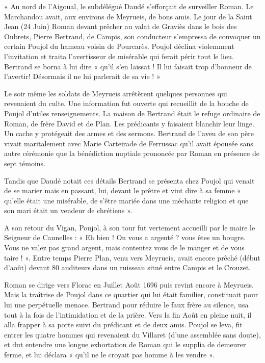 \begin{tcolorbox}[
  colback=white,
  colframe=black,
  boxrule=0.7pt,
  arc=0pt,
  left=0.20cm,
  right=0.20cm,
  top=0.10cm,
  bottom=0.10cm,
  boxsep=0pt
]
\small

« Au nord de l’Aigoual, le subdélégué Daudé s’efforçait de surveiller Roman. Le Marchandou avait, aux environs de Meyrueis, de bons amis. Le jour de la Saint Jean (24 Juin) Roman devant prêcher au valat de Graviès dans le bois des Oubrets, Pierre Bertrand, de Campis, son conducteur s’empressa de convoquer un certain Poujol du hameau voisin de Pourcarès. Poujol déclina violemment l’invitation et traita l’avertisseur de misérable qui ferait périr tout le lieu. Bertrand se borna à lui dire « qu’il s’en laissat ! Il lui faisait trop d’honneur de l’avertir! Désormais il ne lui parlerait de sa vie ! »

Le soir même les soldats de Meyrueis arrêtèrent quelques personnes qui revenaient du culte. Une information fut ouverte qui recueillit de la bouche de Poujol d’utiles renseignements. La maison de Bertrand était le refuge ordinaire de Roman, de frère David et de Plan. Les prédicants y faisaient blanchir leur linge. Un cache y protégeait des armes et des sermons. Bertrand de l’aveu de son père vivait maritalement avec Marie Carteirade de Ferrussac qu’il avait épousée sans autre cérémonie que la bénédiction nuptiale prononcée par Roman en présence de sept témoins.

Tandis que Daudé notait ces détails Bertrand se présenta chez Poujol qui venait de se marier mais en passant, lui, devant le prêtre et vint dire à sa femme « qu’elle était une misérable, de s’être mariée dans une méchante religion et que son mari était un vendeur de chrétiens ».

A son retour du Vigan, Poujol, à son tour fut vertement accueilli par le maire le Seigneur de Caunelles : « Eh bien ! On vous a argenté ? vous êtes un bougre. Vous ne valez pas grand argent, mais contentez vous de le manger et de vous taire ! ». Entre temps Pierre Plan, venu vers Meyrueis, avait encore prêché (début d’août) devant 80 auditeurs dans un ruisseau situé entre Campis et le Crouzet.

Roman se dirige vers Florac en Juillet Août 1696 puis revint encore à Meyrueis. Mais la traîtrise de Poujol dans ce quartier qui lui était familier, constituait pour lui une perpétuelle menace. Bertrand pour réduire le faux frère au silence, usa tout à la fois de l’intimidation et de la prière. Vers la fin Août en pleine nuit, il alla frapper à sa porte suivi du prédicant et de deux amis. Poujol se leva, fit entrer les quatre hommes qui revenaient du Villaret (d’une assemblée sans doute), et dut entendre une longue exhortation de Roman qui le supplia de demeurer ferme, et lui déclara « qu’il ne le croyait pas homme à les vendre ».


\end{tcolorbox}
